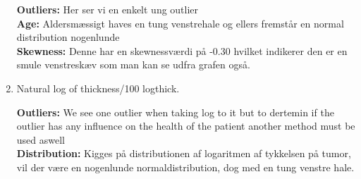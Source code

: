 \begin{enumerate}
\textbf{Outliers: }Her ser vi en enkelt ung outlier\\ 
\textbf{Age: } Aldersmæssigt haves en tung venstrehale og ellers fremstår en normal distribution nogenlunde\\
\textbf{Skewness:} Denne har en skewnessværdi på -0.30 hvilket indikerer den er en smule venstreskæv som man kan se udfra grafen også.
\newpage
\item Natural log of thickness/100 logthick.
\newline
\begin{figure}[h]
    \centering
    \hfill
  \hfill
\end{figure}
\textbf{Outliers: }We see one outlier when taking log to it but to dertemin if the outlier has any influence on the health of the patient another method must be used aswell\\
\textbf{Distribution: }Kigges på distributionen af logaritmen af tykkelsen på tumor, vil der være en nogenlunde normaldistribution, dog med en tung venstre hale.\\

\end{enumerate}
